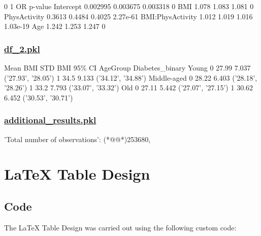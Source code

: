 \documentclass[11pt]{article}
\begin{document}
\begin{codeoutput}
                        0        1       OR   p-value
Intercept        0.002995 0.003675 0.003318         0
BMI                 1.078    1.083    1.081         0
PhysActivity       0.3613   0.4484   0.4025  2.27e-61
BMI:PhysActivity    1.012    1.019    1.016  1.03e-19
Age                 1.242    1.253    1.247         0
\end{codeoutput}\hypertarget{file-df-2-pkl}{}

\subsubsection*{\hyperlink{code-Data Analysis-df-2-pkl}{df\_2.pkl}}

\begin{codeoutput}
                            Mean BMI STD BMI              95\% CI
AgeGroup    Diabetes\_binary                                     
Young       0                  27.99   7.037  ('27.93', '28.05')
            1                   34.5   9.133  ('34.12', '34.88')
Middle-aged 0                  28.22   6.403  ('28.18', '28.26')
            1                   33.2   7.793  ('33.07', '33.32')
Old         0                  27.11   5.442  ('27.07', '27.15')
            1                  30.62   6.452  ('30.53', '30.71')
\end{codeoutput}\hypertarget{file-additional-results-pkl}{}

\subsubsection*{\hyperlink{code-Data Analysis-additional-results-pkl}{additional\_results.pkl}}

\begin{codeoutput}
{
    'Total number of observations': (*@@*)253680,
}
\end{codeoutput}

\section{LaTeX Table Design}
\subsection{{Code}}
The LaTeX Table Design was carried out using the following custom code:
\end{document}
